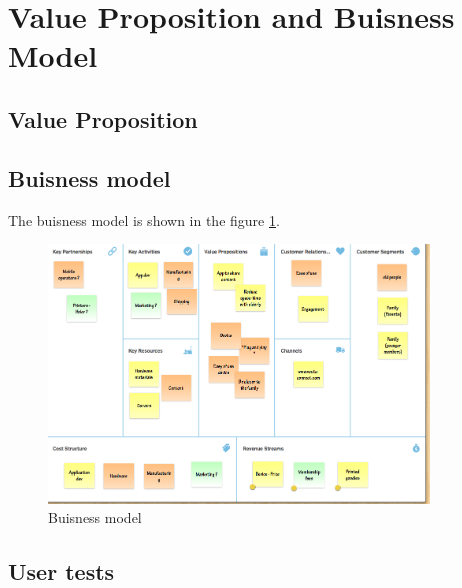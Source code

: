 \section{Value Proposition and Buisness Model}

\subsection{Value Proposition}

\subsection{Buisness model}

The buisness model is shown in the figure \ref{fig:buisness model}.

\begin{figure}[!htb]
    \centering
    \includegraphics[width=0.9\textwidth,keepaspectratio]{chap/buisnessFig/buisness_model.png}
    \caption{Buisness model}
    \label{fig:buisness model}
\end{figure}

\subsection{User tests}

